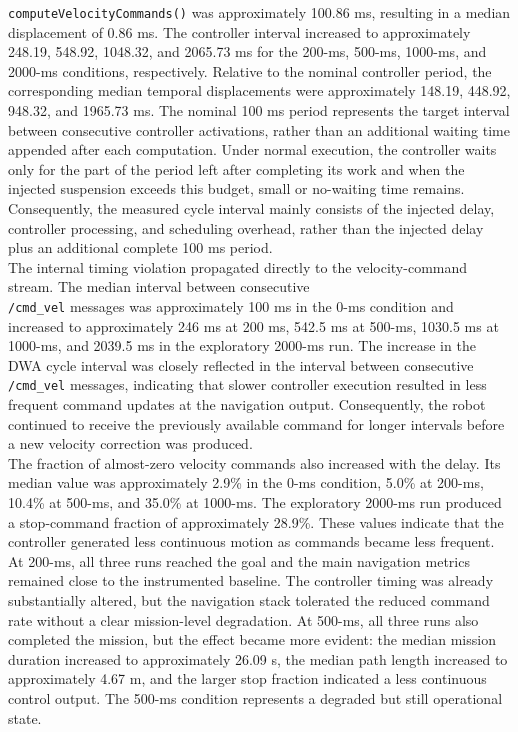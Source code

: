 \noindent \texttt{computeVelocityCommands()} was approximately 100.86 ms, resulting in a median displacement of 0.86 ms. The controller interval increased to approximately 248.19, 548.92, 1048.32, and 2065.73 ms for the 200-ms, 500-ms, 1000-ms, and 2000-ms conditions, respectively. Relative to the nominal controller period, the corresponding median temporal displacements were approximately 148.19, 448.92, 948.32, and 1965.73 ms.
The nominal 100 ms period represents the target interval between consecutive controller activations, rather than an additional waiting time appended after each computation. Under normal execution, the controller waits only for the part of the period left after completing its work and when the injected suspension exceeds this budget, small or no-waiting time remains. Consequently, the measured cycle interval mainly consists of the injected delay, controller processing, and scheduling overhead, rather than the injected delay plus an additional complete 100 ms period.
\\
The internal timing violation propagated directly to the velocity-command stream. The median interval between consecutive 
\\
\texttt{/cmd\_vel} messages was approximately 100 ms in the 0-ms condition and increased to approximately 246 ms at 200 ms, 542.5 ms at 500-ms, 1030.5 ms at 1000-ms, and 2039.5 ms in the exploratory 2000-ms run. The increase in the DWA cycle interval was closely reflected in the interval between consecutive \texttt{/cmd\_vel} messages, indicating that slower controller execution resulted in less frequent command updates at the navigation output. Consequently, the robot continued to receive the previously available command for longer intervals before a new velocity correction was produced.
\\
The fraction of almost-zero velocity commands also increased with the delay.
Its median value was approximately 2.9\% in the 0-ms condition, 5.0\% at 200-ms, 10.4\% at 500-ms, and 35.0\% at 1000-ms. The exploratory 2000-ms run produced a stop-command fraction of approximately 28.9\%. These values indicate that the controller generated less continuous motion as commands became less frequent.
\\
At 200-ms, all three runs reached the goal and the main navigation metrics remained close to the instrumented baseline. The controller timing was already substantially altered, but the navigation stack tolerated the reduced command rate without a clear mission-level degradation. At 500-ms, all three runs also completed the mission, but the effect became more evident: the median mission duration increased to approximately 26.09 s, the median path length increased to approximately 4.67 m, and the larger stop fraction indicated a less continuous control output. The 500-ms condition represents a degraded but still operational state. 
